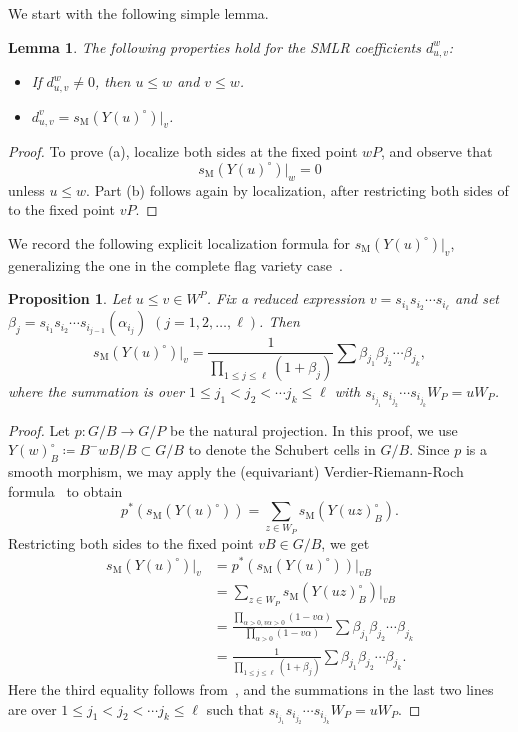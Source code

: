 \documentclass[11pt]{article}
\newtheorem{lemma}[theo]{Lemma}
\newtheorem{prop}[theo]{Proposition}
\theoremstyle{definition}
\numberwithin{equation}{section}
\newcommand{\ssm}{s_{\mathrm{M}}}
\begin{document}
We start with the following simple lemma.
\begin{lemma}\label{lem:CSMLR} The following properties hold
	for the SMLR coefficients $d_{u,v}^w$: 
	\begin{center}
		\begin{itemize}
			\item[(a)] If $d_{u,v}^{w}\neq 0$, then $u\leq w$
			and $v\leq w$.
			\item[(b)] $d_{u,v}^{v}= \ssm({Y(u)^\circ})|_v$.
		\end{itemize}
	\end{center}
\end{lemma}
\begin{proof} To prove (a), localize both sides at the fixed point $wP$, and observe
	that \[ \ssm({Y(u)^\circ})|_{w}=0 \] unless $u\leq w$. Part (b) follows again by localization, 
	after restricting both sides of  to the fixed point $vP$.
\end{proof}

We record the following explicit localization formula for $\ssm({Y(u)^\circ})|_v$, generalizing the one in the complete flag variety case~\cite[Corollary 9.8]{AMSS:shadows}.
\begin{prop}\label{prop:loc}
	Let $u\leq v\in W^P$.
	Fix a reduced expression $v=s_{i_1} s_{i_2} \cdots s_{i_\ell}$
	and set $\beta_j=s_{i_1} s_{i_2} \cdots s_{i_{j-1}}(\alpha_{i_j})$
	$(j=1,2,\ldots,\ell)$.
	Then
	$$\ssm (Y(u)^\circ)|_v=\frac{1}{\prod_{1\leq j\leq \ell}(1+\beta_j)}
	\sum \beta_{j_1}\beta_{j_2}\cdots \beta_{j_k},$$
	where the summation is over $ 1\leq j_1<j_2<\cdots j_k\leq \ell$ with 
	$s_{i_{j_1}}s_{i_{j_2}}\cdots s_{i_{j_k}}W_P=uW_P$.
\end{prop} 
\begin{proof}
	Let $p:G/B\rightarrow G/P$ be the natural projection. In this proof, 
	we use $Y(w)^\circ_B\coloneqq B^-wB/B\subset G/B$ to denote the Schubert cells in $G/B$. 
	Since $p$ is a smooth morphism, we may apply the (equivariant) 
		Verdier-Riemann-Roch formula~\cite[Theorem 4.1]{ohmoto:eqcsm} to obtain
	\[p^*(\ssm (Y(u)^\circ))=\sum_{z\in W_P}\ssm (Y(uz)_B^\circ).\]
	Restricting both sides to the fixed point $vB\in G/B$, we get
	\begin{align*}
		\ssm (Y(u)^\circ)|_{v}&=p^*(\ssm (Y(u)^\circ))|_{vB}\\
		&=\sum_{z\in W_P}\ssm (Y(uz)_B^\circ)|_{vB}\\
		&=\frac{\prod_{\alpha>0,v\alpha>0}(1-v\alpha)}{\prod_{\alpha>0}(1-v\alpha)}\sum \beta_{j_1}\beta_{j_2}\cdots \beta_{j_k}\\
		&=\frac{1}{\prod_{1\leq j\leq \ell}(1+\beta_j)}
		\sum \beta_{j_1}\beta_{j_2}\cdots \beta_{j_k}.
	\end{align*}
	Here the third equality follows from~\cite[Corollary 6.7]{AMSS:shadows}, and the summations in the last two lines are over $ 1\leq j_1<j_2<\cdots j_k\leq \ell$ such that 
	$s_{i_{j_1}}s_{i_{j_2}}\cdots s_{i_{j_k}}W_P=uW_P$.
\end{proof}
\end{document}
